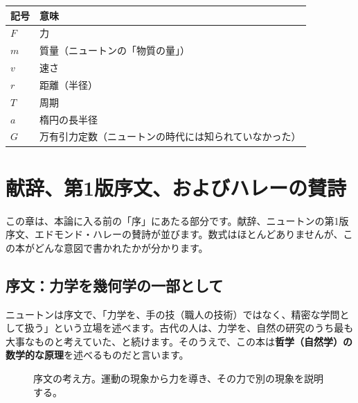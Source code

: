 \documentclass[a4paper,11pt,openany]{ltjsbook}
\begin{document}
\begin{center}
\begin{tabular}{ll}
\toprule
記号 & 意味\\
\midrule
$F$ & 力\\
$m$ & 質量（ニュートンの「物質の量」）\\
$v$ & 速さ\\
$r$ & 距離（半径）\\
$T$ & 周期\\
$a$ & 楕円の長半径\\
$G$ & 万有引力定数（ニュートンの時代には知られていなかった）\\
\bottomrule
\end{tabular}
\end{center}

\chapter{献辞、第1版序文、およびハレーの賛詩}

この章は、本論に入る前の「序」にあたる部分です。献辞、ニュートンの第1版序文、エドモンド・ハレーの賛詩が並びます。数式はほとんどありませんが、この本がどんな意図で書かれたかが分かります。

\section{序文：力学を幾何学の一部として}

ニュートンは序文で、「力学を、手の技（職人の技術）ではなく、精密な学問として扱う」という立場を述べます。古代の人は、力学を、自然の研究のうち最も大事なものと考えていた、と続けます。そのうえで、この本は\textbf{哲学（自然学）の数学的な原理}を述べるものだと言います。

\begin{figure}[htbp]
\centering
{}
\caption{序文の考え方。運動の現象から力を導き、その力で別の現象を説明する。}
\end{figure}
\end{document}
